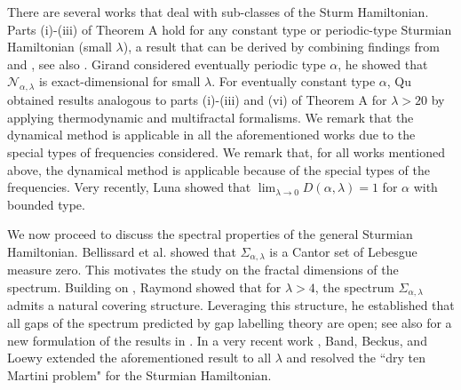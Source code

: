 \documentclass[reqno,11pt,graphicx,]{amsart}
\numberwithin{equation}{section}
\theoremstyle{plain}
\newcommand{\3}{\mathbf{3}}
\begin{document}
	There are several works that deal with sub-classes of the Sturm Hamiltonian. Parts (i)-(iii) of Theorem A hold for any constant type or periodic-type Sturmian Hamiltonian (small $\lambda$), a result that can be derived by combining findings from \cite{Ca2009} and \cite{DGY2016}, see also \cite{Me2014}. Girand \cite{Gi2014} considered eventually periodic type $\alpha$, he showed that
	$\mathcal{N}_{\alpha,\lambda}$ is exact-dimensional for small $\lambda$.
	For eventually constant type $\alpha$, Qu \cite{Qu2016} obtained results analogous to parts (i)-(iii) and (vi) of Theorem A for $\lambda > 20$ by applying thermodynamic and multifractal formalisms. We remark that the dynamical method is applicable in all the aforementioned works due to the special types of frequencies considered. We remark that, for all works mentioned  above, the dynamical method is applicable because of the special types of the frequencies. Very recently, Luna \cite{Lu2024} showed that $\lim_{\lambda\to0}D(\alpha,\lambda)=1$ for $\alpha$ with bounded type.
	
	We now proceed to discuss the spectral properties of the general Sturmian Hamiltonian. Bellissard et al. \cite{BIST1989} showed that $\Sigma_{\alpha,\lambda}$ is a Cantor set of Lebesgue measure zero.
	This motivates the study on the fractal dimensions of the spectrum. 
	Building on \cite{BIST1989}, Raymond \cite{Ra1997} showed that for $\lambda > 4$, the spectrum $ \Sigma_{\alpha,\lambda}$ admits a natural covering structure. Leveraging this structure, he established that all gaps of the spectrum predicted by gap labelling theory are open; see also \cite{BBBRT2024} for a new formulation of the results in \cite{Ra1997}. In a very recent work \cite{BBL2024}, Band, Beckus, and Loewy extended the aforementioned result to all $\lambda$ and resolved the ``dry ten Martini problem" for the Sturmian Hamiltonian.
	
\end{document}
